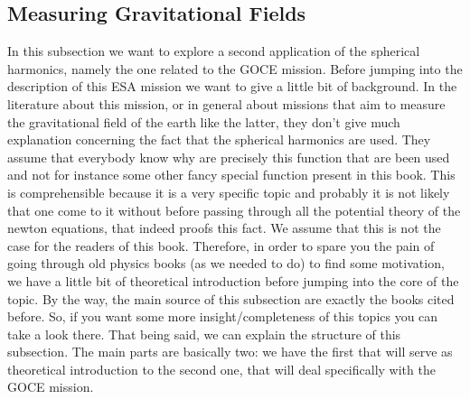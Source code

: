 \subsection{Measuring Gravitational Fields}
In this subsection we want to explore a second application of the spherical harmonics, namely the one related to the GOCE mission. 
Before jumping into the description of this ESA mission we want to give a little bit of background. In the literature about this mission, 
or in general about missions that aim to measure the gravitational field of the earth like the latter, they don’t give much explanation 
concerning the fact that the spherical harmonics are used. They assume that everybody know why are precisely this function that are been 
used and not for instance some other fancy special function present in this book. This is comprehensible because it is a very specific topic 
and probably it is not likely that one come to it without before passing through all the potential theory of the newton equations, that indeed 
proofs this fact. We assume that this is not the case for the readers of this book. Therefore, in order to spare you the pain of going through 
old physics books \cite{} \cite{} \cite{} (as we needed to do) to find some motivation, we have a little bit of theoretical introduction before 
jumping into the core of the topic. By the way, the main source of this subsection are exactly the books cited before. So, if you want some more 
insight/completeness of this topics you can take a look there. That being said, we can explain the structure of this subsection. The main parts 
are basically two: we have the first that will serve as theoretical introduction to the second one, that will deal specifically with the 
GOCE mission. 

